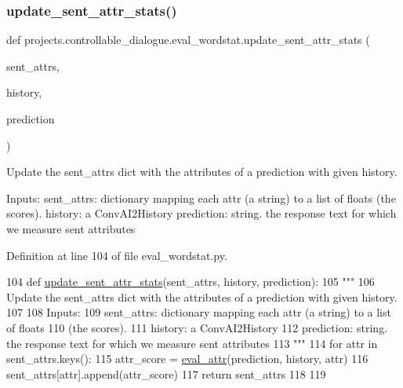 \subsubsection{\texorpdfstring{update\+\_\+sent\+\_\+attr\+\_\+stats()}{update\_sent\_attr\_stats()}}
{\footnotesize\ttfamily def projects.\+controllable\+\_\+dialogue.\+eval\+\_\+wordstat.\+update\+\_\+sent\+\_\+attr\+\_\+stats (\begin{DoxyParamCaption}\item[{}]{sent\+\_\+attrs,  }\item[{}]{history,  }\item[{}]{prediction }\end{DoxyParamCaption})}

\begin{DoxyVerb}Update the sent_attrs dict with the attributes of a prediction with given history.

Inputs:
  sent_attrs: dictionary mapping each attr (a string) to a list of floats
    (the scores).
  history: a ConvAI2History
  prediction: string. the response text for which we measure sent attributes
\end{DoxyVerb}
 

Definition at line 104 of file eval\+\_\+wordstat.\+py.


\begin{DoxyCode}
104 \textcolor{keyword}{def }\hyperlink{namespaceprojects_1_1controllable__dialogue_1_1eval__wordstat_a1bc3cda7d486add0d740338df4688622}{update\_sent\_attr\_stats}(sent\_attrs, history, prediction):
105     \textcolor{stringliteral}{"""}
106 \textcolor{stringliteral}{    Update the sent\_attrs dict with the attributes of a prediction with given history.}
107 \textcolor{stringliteral}{}
108 \textcolor{stringliteral}{    Inputs:}
109 \textcolor{stringliteral}{      sent\_attrs: dictionary mapping each attr (a string) to a list of floats}
110 \textcolor{stringliteral}{        (the scores).}
111 \textcolor{stringliteral}{      history: a ConvAI2History}
112 \textcolor{stringliteral}{      prediction: string. the response text for which we measure sent attributes}
113 \textcolor{stringliteral}{    """}
114     \textcolor{keywordflow}{for} attr \textcolor{keywordflow}{in} sent\_attrs.keys():
115         attr\_score = \hyperlink{namespaceprojects_1_1controllable__dialogue_1_1controllable__seq2seq_1_1controls_afc2b447cbf1dcb4a754d080d2e611c24}{eval\_attr}(prediction, history, attr)
116         sent\_attrs[attr].append(attr\_score)
117     \textcolor{keywordflow}{return} sent\_attrs
118 
119 
\end{DoxyCode}


